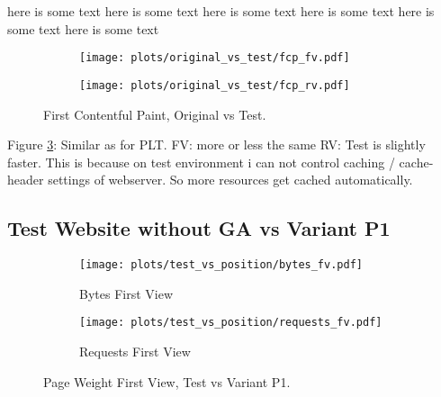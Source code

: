 here is some text here is some text here is some text here is some text here is some text here is some text 


\begin{figure}
	\centering
	\begin{subfigure}{.5\textwidth}
		\centering
		\texttt{[image: plots/original\_vs\_test/fcp\_fv.pdf]}
		\label{fig:sub1}
	\end{subfigure}%
	\begin{subfigure}{.5\textwidth}
		\centering
		\texttt{[image: plots/original\_vs\_test/fcp\_rv.pdf]}
		\label{fig:sub2}
	\end{subfigure}
	\caption{First Contentful Paint, Original vs Test.}
	\label{figure:fcp_original_test}
\end{figure}

Figure \ref{figure:fcp_original_test}:
Similar as for PLT.
FV: more or less the same
RV: Test is slightly faster. This is because on test environment i can not control caching / cache-header settings of webserver. So more resources get cached automatically.









\subsection{Test Website without GA vs Variant P1}



\begin{figure}
	\centering
	\begin{subfigure}{.5\textwidth}
		\centering
		\texttt{[image: plots/test\_vs\_position/bytes\_fv.pdf]}
		\caption{Bytes First View}
		\label{fig:sub1}
	\end{subfigure}%
	\begin{subfigure}{.5\textwidth}
		\centering
		\texttt{[image: plots/test\_vs\_position/requests\_fv.pdf]}
		\caption{Requests First View}
		\label{fig:sub2}
	\end{subfigure}
	\caption{Page Weight First View, Test vs Variant P1.}
	\label{figure:plt_original_test}
\end{figure}


